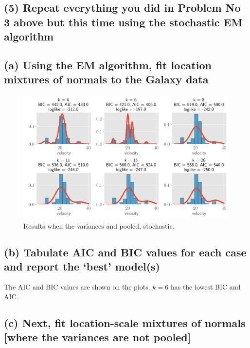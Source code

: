 \documentclass[11pt]{article}
\begin{document}
\subsection*{(5) Repeat everything you did in Problem No 3 above but this time using the stochastic EM algorithm}

\subsection*{ (a) Using the EM algorithm, fit location mixtures of normals to the Galaxy data}

\begin{figure}[!h]
    \centering
    \includegraphics[scale=.6
    ]{homework_4/figures/galaxies_3.png}
    \caption{Results when the variances and pooled, stochastic.}
    \label{fig:my_label}
\end{figure}
\newpage

\subsection*{ (b) Tabulate AIC and BIC values for each case and report the ‘best’ model(s)}

The AIC and BIC values are shown on the plots. $k=6$ has the lowest BIC and AIC.

\subsection*{(c) Next, fit location-scale mixtures of normals [where the variances are not pooled]}
\end{document}
